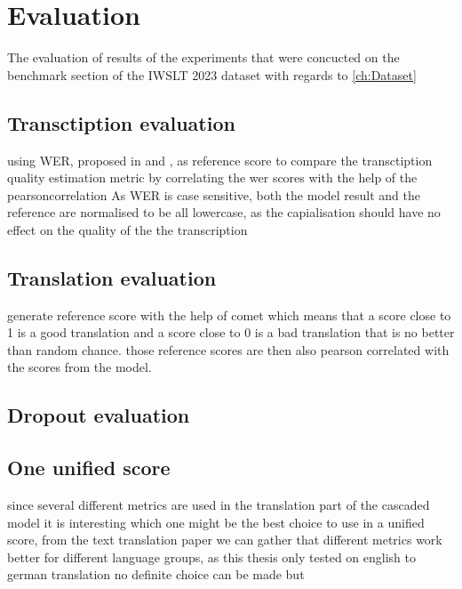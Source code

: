 
\chapter{Evaluation}
\label{ch:Evaluation}
The evaluation of results of the experiments that were concucted on the benchmark section of the IWSLT 2023 dataset \cite{sperber2024evaluating} with regards to \ref{ch:Dataset}

\section{Transctiption evaluation}


using WER, proposed in \cite{woodard1982} and \cite{morris2004}, as reference score to compare the transctiption quality estimation metric by correlating the wer scores with the help of the pearsoncorrelation \cite{2020SciPy-NMeth}
As WER is case sensitive, both the model result and the reference are normalised to be all lowercase, as the capialisation should have no effect on the quality of the the transcription

\section{Translation evaluation}

generate reference score with the help of comet \cite{rei-etal-2020-comet} which means that a score close to 1 is a good translation and a score close to 0 is a bad translation that is no better than random chance.
those reference scores are then also pearson correlated with the scores from the model. 

\section{Dropout evaluation}



\section{One unified score}
since several different metrics are used in the translation part of the cascaded model it is interesting which one might be the best choice to use in a unified score, from the text translation paper \cite{fomicheva2020unsupervised} we can gather that different metrics work better for different language groups, as this thesis only tested on english to german translation no definite choice can be made but 

